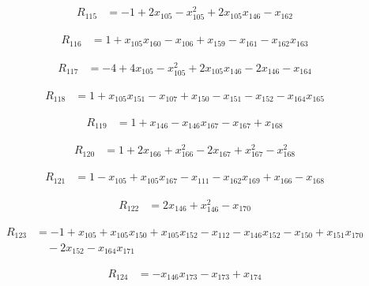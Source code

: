 \begin{align*}
R_{115} &= -1 +2 x_{105} -x_{105}^{2} +2 x_{105} x_{146} -x_{162}
\end{align*}

\begin{align*}
R_{116} &= 1 +x_{105} x_{160} -x_{106} +x_{159} -x_{161} -x_{162} x_{163}
\end{align*}

\begin{align*}
R_{117} &= -4 +4 x_{105} -x_{105}^{2} +2 x_{105} x_{146} -2 x_{146} -x_{164}
\end{align*}

\begin{align*}
R_{118} &= 1 +x_{105} x_{151} -x_{107} +x_{150} -x_{151} -x_{152} -x_{164} x_{165}
\end{align*}

\begin{align*}
R_{119} &= 1 +x_{146} -x_{146} x_{167} -x_{167} +x_{168}
\end{align*}

\begin{align*}
R_{120} &= 1 +2 x_{166} +x_{166}^{2} -2 x_{167} +x_{167}^{2} -x_{168}^{2}
\end{align*}

\begin{align*}
R_{121} &= 1 -x_{105} +x_{105} x_{167} -x_{111} -x_{162} x_{169} +x_{166} -x_{168}
\end{align*}

\begin{align*}
R_{122} &= 2 x_{146} +x_{146}^{2} -x_{170}
\end{align*}

\begin{align*}
R_{123} &= -1 +x_{105} +x_{105} x_{150} +x_{105} x_{152} -x_{112} -x_{146} x_{152} -x_{150} +x_{151} x_{170} \\
&\quad -2 x_{152} -x_{164} x_{171}
\end{align*}

\begin{align*}
R_{124} &= -x_{146} x_{173} -x_{173} +x_{174}
\end{align*}

